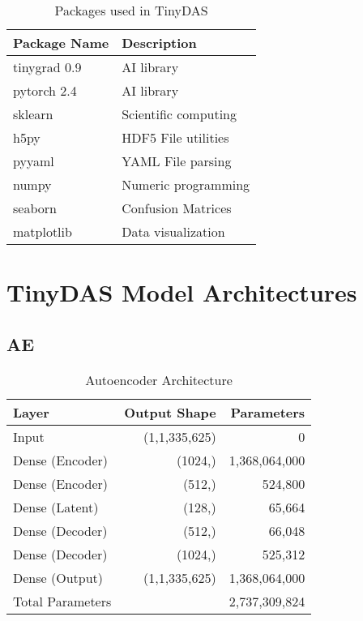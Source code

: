 \begin{table}[!htbp]
\centering
\caption{Packages used in TinyDAS}
\label{tab:tinydas-packages}
\small
\begin{tabular}{>{\raggedright\arraybackslash}p{}>{\raggedright\arraybackslash}p{}}
\toprule
\textbf{Package Name} & \textbf{Description} \\
\midrule
\rowcolor{gray!10} tinygrad 0.9 & AI library \\
pytorch 2.4 & AI library \\
\rowcolor{gray!10} sklearn & Scientific computing \\
h5py & HDF5 File utilities \\
\rowcolor{gray!10} pyyaml & YAML File parsing \\
numpy & Numeric programming \\
\rowcolor{gray!10} seaborn & Confusion Matrices \\
matplotlib & Data visualization \\
\bottomrule
\end{tabular}
\end{table}


\section{TinyDAS Model Architectures}
\label{app:archs}

\subsection{AE}
\label{app:a-ae}

\begin{table}[!h]
    \centering
    \begin{tabular}{lrr}
        \toprule
        Layer & Output Shape & Parameters \\
        \midrule
        Input & (1,1,335,625) & 0 \\
        Dense (Encoder) & (1024,) & 1,368,064,000 \\
        Dense (Encoder) & (512,) & 524,800 \\
        Dense (Latent) & (128,) & 65,664 \\
        Dense (Decoder) & (512,) & 66,048 \\
        Dense (Decoder) & (1024,) & 525,312 \\
        Dense (Output) & (1,1,335,625) & 1,368,064,000 \\
        \midrule
        Total Parameters & & 2,737,309,824 \\
        \bottomrule
    \end{tabular}
    \caption{Autoencoder Architecture}
    \label{tab:ae}
\end{table}


